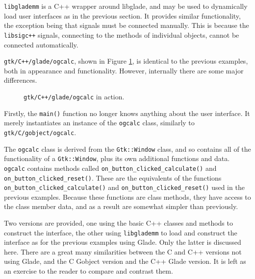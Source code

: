 \documentclass[a4paper,oneside]{article}
\newcommand{\program}[1]{\texttt{#1}}
\newcommand{\class}[1]{\texttt{#1}}
\newcommand{\function}[1]{\texttt{#1()}}
\begin{document}
\program{libglademm} is a C++ wrapper around libglade, and may be used
to dynamically load user interfaces as in the previous section.  It
provides similar functionality, the exception being that signals must
be connected manually.  This is because the \program{libsigc++}
signals, connecting to the methods of individual objects, cannot be
connected automatically.

\program{gtk/C++/glade/ogcalc}, shown in Figure \ref{fig:ogcalcmm}, is
identical to the previous examples, both in appearance and
functionality.  However, internally there are some major differences.

\begin{figure}
  \centering
  \caption[\program{gtk/C++/glade/ogcalc} in action]{\program{gtk/C++/glade/ogcalc} in
    action.}
  \label{fig:ogcalcmm}
\end{figure}

Firstly, the \function{main} function no longer knows anything about
the user interface.  It merely instantiates an instance of the
\class{ogcalc} class, similarly to \program{gtk/C/gobject/ogcalc}.

The \class{ogcalc} class is derived from the \class{Gtk::Window}
class, and so contains all of the functionality of a
\class{Gtk::Window}, plus its own additional functions and data.
\class{ogcalc} contains methods called
\function{on\_button\_clicked\_calculate} and
\function{on\_button\_clicked\_reset}.  These are the equivalents of
the functions \function{on\_button\_clicked\_calculate} and
\function{on\_button\_clicked\_reset} used in the previous examples.
Because these functions are class methods, they have access to the
class member data, and as a result are somewhat simpler than
previously.

Two versions are provided, one using the basic C++ classes and methods
to construct the interface, the other using \program{libglademm} to
load and construct the interface as for the previous examples using
Glade.  Only the latter is discussed here.  There are a great many
similarities between the C and C++ versions not using Glade, and the C
Gobject version and the C++ Glade version.  It is left as an exercise
to the reader to compare and contrast them.
\end{document}
